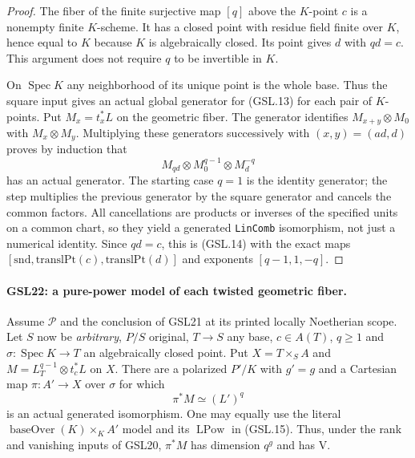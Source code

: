 \documentclass[11pt,a4paper]{article}
\numberwithin{equation}{section}
\theoremstyle{remark}\newtheorem{remark}[theorem]{Remark}
\begin{document}
\begin{proof}
The fiber of the finite surjective map $[q]$ above the $K$-point
$c$ is a nonempty finite $K$-scheme.  It has a closed point with
residue field finite over $K$, hence equal to $K$ because $K$ is
algebraically closed.  Its point gives $d$ with $qd=c$.  This
argument does not require $q$ to be invertible in $K$.

On $\operatorname{Spec}K$ any neighborhood of its unique point
is the whole base.  Thus the square input gives an actual
global generator for (GSL.13) for each pair of $K$-points.
Put $M_x=t_x^*L$ on the geometric fiber.  The generator
identifies $M_{x+y}\otimes M_0$ with $M_x\otimes M_y$.
Multiplying these generators successively with $(x,y)=(ad,d)$
proves by induction that
\[
 M_{qd}\otimes M_0^{q-1}\otimes M_d^{-q}
\]
has an actual generator.  The starting case $q=1$ is the
identity generator; the step multiplies the previous generator
by the square generator and cancels the common factors.
All cancellations are products or inverses of the specified
units on a common chart, so they yield a generated
\texttt{Lin\allowbreak Comb} isomorphism, not just a numerical identity.
Since $qd=c$, this is (GSL.14) with the exact maps
$[\mathrm{snd},\mathrm{translPt}(c),\mathrm{translPt}(d)]$
and exponents $[q-1,1,-q]$.
\end{proof}

\paragraph{GSL22: a pure-power model of each twisted geometric fiber.}
\label{claim:GSL22}
Assume $\mathcal P$ and the conclusion of GSL21 at its printed
locally Noetherian scope.  Let $S$ now be \emph{arbitrary},
$P/S$ original, $T\to S$ any base, $c\in A(T)$, $q\ge1$ and
$\sigma:\operatorname{Spec}K\to T$ an algebraically closed point.
Put $X=T\times_S A$ and
$M=L_T^{q-1}\otimes t_c^*L$ on $X$.  There are a polarized
$P'/K$ with $g'=g$ and a Cartesian map
$\pi:A'\to X$ over $\sigma$ for which
\[
 \pi^*M\simeq (L')^q \tag{GSL.15}
\]
is an actual generated isomorphism.  One may equally use the
literal $\operatorname{baseOver}(K)\times_K A'$ model and its
$\operatorname{LPow}$ in (GSL.15).  Thus, under the rank and
vanishing inputs of GSL20, $\pi^*M$ has dimension $q^g$ and
has $\mathrm V$.
\end{document}
